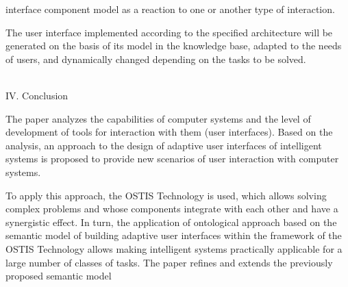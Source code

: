 \documentclass{article}
\begin{document}
\begin{multicols}{2}
 \noindent interface component model as a reaction to one or
another type of interaction.
\par The user interface implemented according to the specified architecture will be generated on the basis of its
model in the knowledge base, adapted to the needs of
users, and dynamically changed depending on the tasks
to be solved.
\begin {center}
\\IV. Conclusion
\end {center}
The paper analyzes the capabilities of computer systems and the level of development of tools for interaction
with them (user interfaces). Based on the analysis, an 
approach to the design of adaptive user interfaces of
intelligent systems is proposed to provide new scenarios
of user interaction with computer systems.
\par To apply this approach, the OSTIS Technology is used,
which allows solving complex problems and whose components integrate with each other and have a synergistic
effect. In turn, the application of ontological approach
based on the semantic model of building adaptive user interfaces within the framework of the OSTIS Technology
allows making intelligent systems practically applicable
for a large number of classes of tasks. The paper refines
and extends the previously proposed semantic model

\end{multicols}
\newpage
\end{document}
